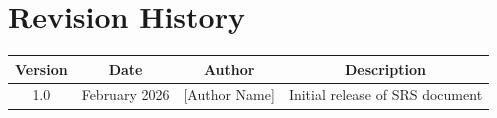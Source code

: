 \section{Revision History}

\begin{longtable}{|c|c|c|c|}
\hline
\textbf{Version} & \textbf{Date} & \textbf{Author} & \textbf{Description} \\
\hline
1.0 & February 2026 & [Author Name] & Initial release of SRS document \\
\hline
\end{longtable}